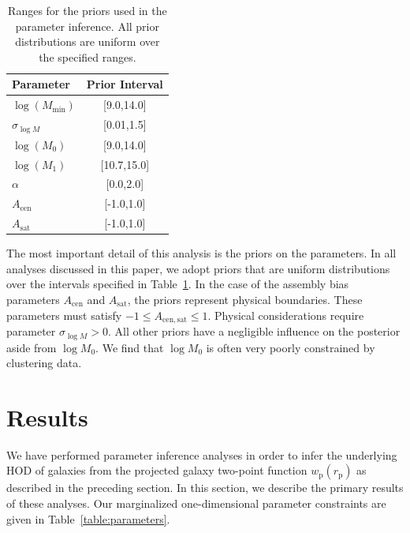 \documentclass[usenatbib,usegraphicx,letterpaper]{mn2e}
\newcommand{\wprp}{w_{\mathrm{p}}}
\newcommand{\rp}{r_{\mathrm{p}}}
\begin{document}
\begin{table}
\begin{center}
{\renewcommand{\arraystretch}{1.3}
\renewcommand{\tabcolsep}{0.2cm}
\begin{tabular}{l c}
\hline 
\hline
Parameter & Prior Interval\\ 
\hline
$\log (M_{\mathrm{min}})$ & [9.0,14.0] \\
$\sigma_{\log M}$ & [0.01,1.5] \\
$\log (M_0)$ & [9.0,14.0]\\
$\log (M_1)$ & [10.7,15.0]\\
$\alpha$ & [0.0,2.0]\\
$A_{\mathrm{cen}}$ & [-1.0,1.0]\\
$A_{\mathrm{sat}}$ & [-1.0,1.0]\\
\hline
\end{tabular}
\medskip
\caption{
Ranges for the priors used in the parameter inference. All prior distributions are uniform over the 
specified ranges.}
 }
 \label{table:priors}
 \end{center}
\end{table}


The most important detail of this analysis is the priors on the parameters. In all analyses 
discussed in this paper, we adopt priors that are uniform distributions over the intervals 
specified in Table~\ref{table:priors}. In the case of the assembly bias parameters 
$A_{\mathrm{cen}}$ and $A_{\mathrm{sat}}$, the priors represent physical 
boundaries. These parameters must satisfy $-1 \le A_{\mathrm{cen,sat}} \le 1$. 
Physical considerations require parameter $\sigma_{\log M} > 0$. All other 
priors have a negligible influence on the posterior aside from $\log M_0$. 
We find that $\log M_0$ is often very poorly constrained by clustering data.


\section{Results}
\label{section:results}

We have performed parameter inference analyses in order to infer the underlying HOD of 
galaxies from the projected galaxy two-point function $\wprp(\rp)$ as described in the preceding 
section. In this section, we describe the primary results of these analyses. Our marginalized 
one-dimensional parameter constraints are given in Table~\ref{table:parameters}.
\end{document}
